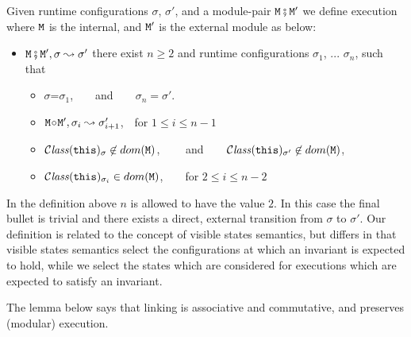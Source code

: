 \begin{definition}
\label{def:execution:internal:external}
\label{def:module_pair_execution} 
Given runtime configurations $\sigma$,  $\sigma'$,  and a module-pair ${\mbox{\tt{\ensuremath{{\mbox{\tt{M}}}}}}} \fatsemi {\mbox{\tt{\ensuremath{{\mbox{\tt{M}}}}}}}'$ we define
execution where ${\mbox{\tt{\ensuremath{{\mbox{\tt{M}}}}}}}$ is the internal, and ${\mbox{\tt{\ensuremath{{\mbox{\tt{M}}}}}}}'$ is the external module as below:
 
\begin{itemize}
\item
${\mbox{\tt{\ensuremath{{\mbox{\tt{M}}}}}}} \fatsemi {\mbox{\tt{\ensuremath{{\mbox{\tt{M}}}}}}}', \sigma \leadsto \sigma'$ \IFF
there exist  $n\geq 2$ and runtime configurations $\sigma_1$,  ...
$\sigma_n$, such that
\begin{itemize}
\item
$\sigma$=$\sigma_1$,\ \  \ \ and\ \ \ \ $\sigma_n=\sigma'$.
\item
${\mbox{\tt{\ensuremath{{\mbox{\tt{M}}}}}}} \!\circ\! {\mbox{\tt{\ensuremath{{\mbox{\tt{M}}}}}}}', \sigma_i \leadsto \sigma_{i+1}'$,\  \  for $1\leq i \leq n\!-\!1$
\item
${\mathcal C}{\mathit{lass}}({\mbox{\tt{this}}})_{\sigma}\not\in dom({{\mbox{\tt{\ensuremath{{\mbox{\tt{M}}}}}}}})$,  \ \  \ \ and\ \ \ \
${\mathcal C}{\mathit{lass}}({\mbox{\tt{this}}})_{\sigma'} \not\in dom({{\mbox{\tt{\ensuremath{{\mbox{\tt{M}}}}}}}})$,
\item
 ${\mathcal C}{\mathit{lass}}({\mbox{\tt{this}}})_{\sigma_i} \in dom({{\mbox{\tt{\ensuremath{{\mbox{\tt{M}}}}}}}})$,\ \ \ \ for $2\leq i \leq n\!-\!2$
\end{itemize}
\end{itemize}

\end{definition}

In the definition above $n$ is allowed to have the value $2$. In this case the final bullet is trivial and  there exists a direct, external transition from $\sigma$ to $\sigma'$.  Our definition is related to the concept of visible states semantics, but differs in that visible states semantics select the configurations at which an invariant is expected to hold, while we select the states which are considered for executions which are expected to satisfy an invariant. 

The lemma below says  that linking is associative and commutative, and preserves (modular) execution.

